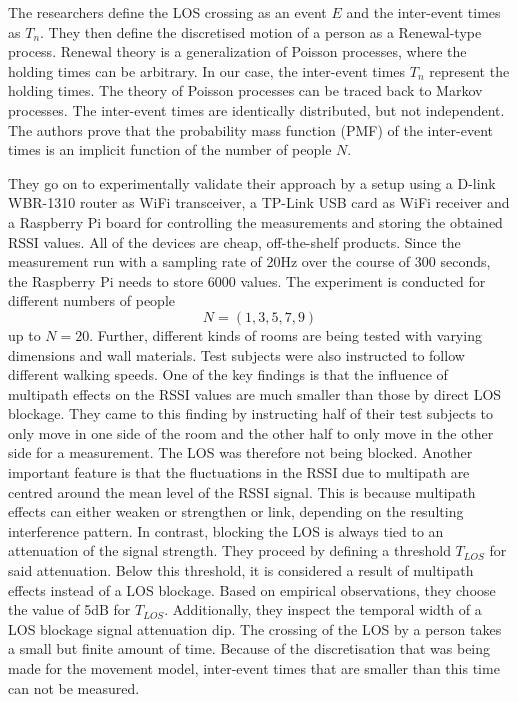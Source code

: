 \documentclass[conference]{IEEEtran}
\begin{document}
The researchers define the LOS crossing as an event $E$ and the inter-event times as $T_n$. They then define the discretised motion of a person as a Renewal-type process. Renewal theory is a generalization of Poisson processes, where the holding times can be arbitrary. In our case, the inter-event times $T_n$ represent the holding times. The theory of Poisson processes can be traced back to Markov processes. The inter-event times are identically distributed, but not independent. The authors prove that the probability mass function (PMF) of the inter-event times is an implicit function of the number of people $N$.
\par
They go on to experimentally validate their approach by a setup using a D-link WBR-1310 router as WiFi transceiver, a TP-Link USB card as WiFi receiver and a Raspberry Pi board for controlling the measurements and storing the obtained RSSI values. All of the devices are cheap, off-the-shelf products. Since the measurement run with a sampling rate of 20Hz over the course of 300 seconds, the Raspberry Pi needs to store 6000 values. The experiment is conducted for different numbers of people $$N = (1, 3, 5, 7, 9)$$ up to $N=20$. Further, different kinds of rooms are being tested with varying dimensions and wall materials. Test subjects were also instructed to follow different walking speeds. 
One of the key findings is that the influence of multipath effects on the RSSI values are much smaller than those by direct LOS blockage. They came to this finding by instructing half of their test subjects to only move in one side of the room and the other half to only move in the other side for a measurement. The LOS was therefore not being blocked. Another important feature is that the fluctuations in the RSSI due to multipath are centred around the mean level of the RSSI signal. This is because multipath effects can either weaken or strengthen or link, depending on the resulting interference pattern. In contrast, blocking the LOS is always tied to an attenuation of the signal strength. They proceed by defining a threshold $T_{LOS}$ for said attenuation. Below this threshold, it is considered a result of multipath effects instead of a LOS blockage. Based on empirical observations, they choose the value of 5dB for $T_{LOS}$. Additionally, they inspect the temporal width of a LOS blockage signal attenuation dip. The crossing of the LOS by a person takes a small but finite amount of time. Because of the discretisation that was being made for the movement model, inter-event times that are smaller than this time can not be measured.
\end{document}
